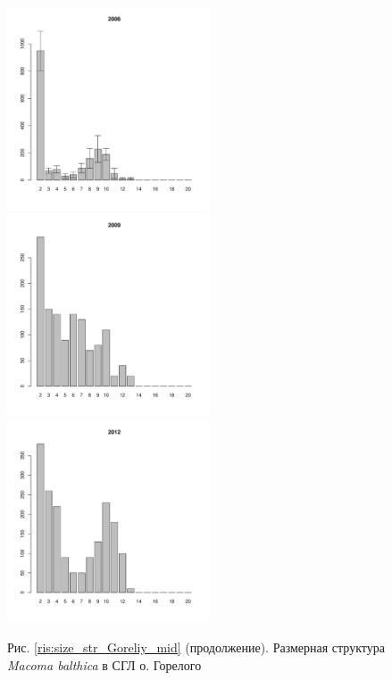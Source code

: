 \begin{figure}[hp]
\begin{minipage}[b]{.3\linewidth}
\begin{center}
	\end{center}
	\end{minipage}
	\begin{minipage}[b]{.3\linewidth}
	\begin{center}
	\includegraphics[width=60mm]{../White_Sea/Luvenga_Goreliy/middle2_2006_.pdf}
	\end{center}
	\end{minipage}
	\hfill
	\begin{minipage}[b]{.3\linewidth}
	\begin{center}
	\includegraphics[width=60mm]{../White_Sea/Luvenga_Goreliy/middle2_2009_.pdf}
	\end{center}
	\end{minipage}
	\hfill
	\begin{minipage}[b]{.3\linewidth}
	\begin{center}
	\includegraphics[width=60mm]{../White_Sea/Luvenga_Goreliy/middle2_2012_.pdf}
	\end{center}
	\end{minipage}
	\begin{center}
Рис. \ref{ris:size_str_Goreliy_mid} (продолжение). Размерная структура {\it Macoma balthica} в СГЛ о. Горелого
\end{center}
\end{figure}


